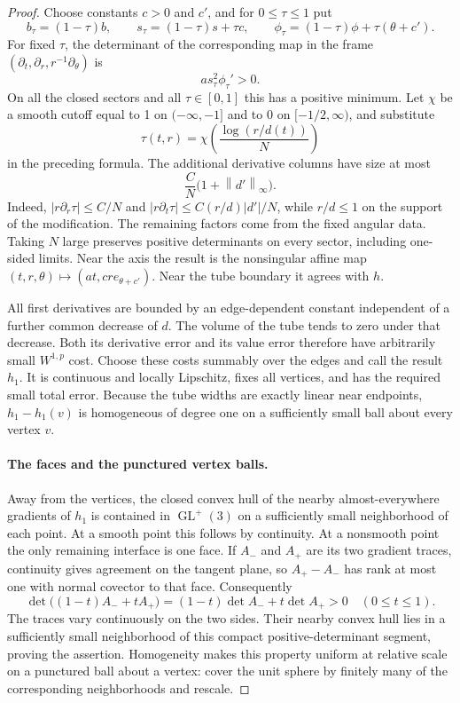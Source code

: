 \documentclass[11pt]{article}
\numberwithin{equation}{section}
\theoremstyle{definition}
\theoremstyle{remark}
\newcommand{\norm}[1]{\left\lVert #1\right\rVert}
\DeclareMathOperator{\GL}{GL}
\begin{document}
\begin{proof}
Choose constants $c>0$ and $c'$, and for $0\le\tau\le1$ put
\[
 b_\tau=(1-\tau)b,\qquad
 s_\tau=(1-\tau)s+\tau c,\qquad
 \phi_\tau=(1-\tau)\phi+\tau(\theta+c').
\]
For fixed $\tau$, the determinant of the corresponding map in the
frame $(\partial_t,\partial_r,r^{-1}\partial_\theta)$ is
\begin{equation}
 \label{sm:edge-determinant}
 a s_\tau^2\phi_\tau'>0.
\end{equation}
On all the closed sectors and all $\tau\in[0,1]$ this has a
positive minimum.  Let $\chi$ be a smooth cutoff equal to 1 on
$(-\infty,-1]$ and to 0 on $[-1/2,\infty)$, and substitute
\[
 \tau(t,r)=\chi\!\left(\frac{\log(r/d(t))}{N}\right)
\]
in the preceding formula.  The additional derivative columns have
size at most
\begin{equation}
 \label{sm:edge-cutoff-error}
 \frac{C}{N}\bigl(1+\norm{d'}_\infty\bigr).
\end{equation}
Indeed, $|r\partial_r\tau|\le C/N$ and
$|r\partial_t\tau|\le C(r/d)|d'|/N$, while $r/d\le1$ on
the support of the modification.  The remaining factors come from
the fixed angular data.  Taking $N$ large preserves positive
determinants on every sector, including one-sided limits.
Near the axis the result is the nonsingular affine map
$(t,r,\theta)\mapsto(at,cr e_{\theta+c'})$.
Near the tube boundary it agrees with $h$.

All first derivatives are bounded by an edge-dependent constant
independent of a further common decrease of $d$.  The volume of the
tube tends to zero under that decrease.  Both its derivative error
and its value error therefore have arbitrarily small $W^{1,p}$
cost.  Choose these costs summably over the edges and call the
result $h_1$.  It is continuous and locally Lipschitz, fixes all
vertices, and has the required small total error.  Because the
tube widths are exactly linear near endpoints, $h_1-h_1(v)$ is
homogeneous of degree one on a sufficiently small ball about every
vertex $v$.

\paragraph{The faces and the punctured vertex balls.}
Away from the vertices, the closed convex hull of the nearby
almost-everywhere gradients of $h_1$ is contained in
$\GL^+(3)$ on a sufficiently small neighborhood of each point.
At a smooth point this follows by continuity.  At a nonsmooth
point the only remaining interface is one face.  If $A_-$ and
$A_+$ are its two gradient traces, continuity gives agreement on
the tangent plane, so $A_+-A_-$ has rank at most one with normal
covector to that face.  Consequently
\begin{equation}
 \label{sm:face-segment}
 \det\bigl((1-t)A_-+tA_+\bigr)
 =(1-t)\det A_-+t\det A_+>0\quad(0\le t\le1).
\end{equation}
The traces vary continuously on the two sides.  Their nearby
convex hull lies in a sufficiently small neighborhood of this
compact positive-determinant segment, proving the assertion.
Homogeneity makes this property uniform at relative scale on
a punctured ball about a vertex: cover the unit sphere by finitely
many of the corresponding neighborhoods and rescale.


\end{proof}
\end{document}
